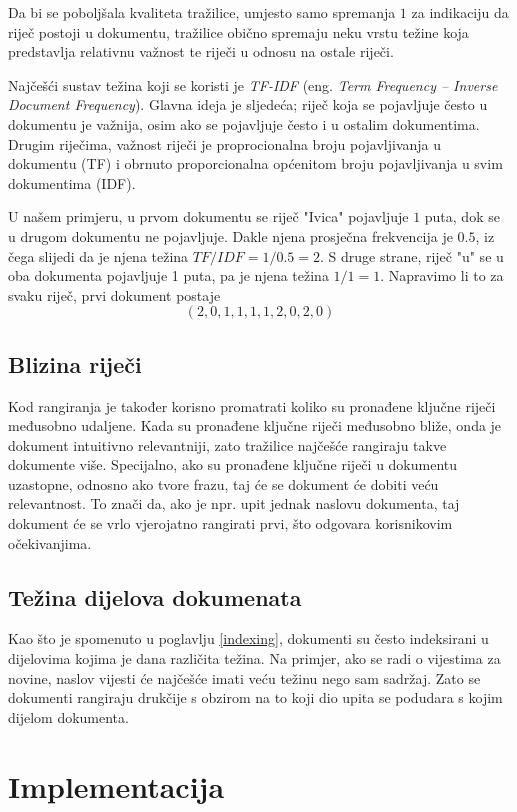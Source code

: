 \documentclass[a4paper,twoside,12pt]{memoir}
\begin{document}
Da bi se poboljšala kvaliteta tražilice, umjesto samo spremanja $1$ za indikaciju da riječ postoji u dokumentu, tražilice obično spremaju neku vrstu težine koja predstavlja relativnu važnost te riječi u odnosu na ostale riječi.

Najčešći sustav težina koji se koristi je \textit{TF-IDF} (eng. \textit{Term Frequency – Inverse Document Frequency}). Glavna ideja je sljedeća; riječ koja se pojavljuje često u dokumentu je važnija, osim ako se pojavljuje često i u ostalim dokumentima. Drugim riječima, važnost riječi je proprocionalna broju pojavljivanja u dokumentu (TF) i obrnuto proporcionalna općenitom broju pojavljivanja u svim dokumentima (IDF).

U našem primjeru, u prvom dokumentu se riječ "Ivica" pojavljuje $1$ puta, dok se u drugom dokumentu ne pojavljuje. Dakle njena prosječna frekvencija je $0.5$, iz čega slijedi da je njena težina $TF / IDF = 1 / 0.5 = 2$. S druge strane, riječ "u" se u oba dokumenta pojavljuje 1 puta, pa je njena težina $1 / 1 = 1$. Napravimo li to za svaku riječ, prvi dokument postaje $$(2,0,1,1,1,1,2,0,2,0)$$

\section{Blizina riječi}

Kod rangiranja je također korisno promatrati koliko su pronađene ključne riječi međusobno udaljene. Kada su pronađene ključne riječi međusobno bliže, onda je dokument intuitivno relevantniji, zato tražilice najčešće rangiraju takve dokumente više. Specijalno, ako su pronađene ključne riječi u dokumentu uzastopne, odnosno ako tvore frazu, taj će se dokument će dobiti veću relevantnost. To znači da, ako je npr. upit jednak naslovu dokumenta, taj dokument će se vrlo vjerojatno rangirati prvi, što odgovara korisnikovim očekivanjima.

\section{Težina dijelova dokumenata}

Kao što je spomenuto u poglavlju \ref{indexing}, dokumenti su često indeksirani u dijelovima kojima je dana različita težina. Na primjer, ako se radi o vijestima za novine, naslov vijesti će najčešće imati veću težinu nego sam sadržaj. Zato se dokumenti rangiraju drukčije s obzirom na to koji dio upita se podudara s kojim dijelom dokumenta.

\chapter{Implementacija}
\end{document}
